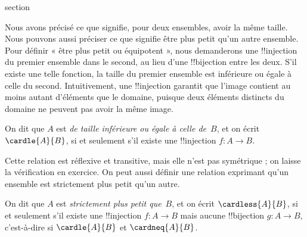 \documentclass[11pt,a4paper,openany]{memoir}
\begin{document}
\endgroup



\begingroup
\expandafter\def\csname ol@sectioncs\endcsname{section}
\def\olfilename{comparing-size}




\begin{explain}
Nous avons précisé ce que signifie, pour deux ensembles, avoir la
même taille. Nous pouvons aussi préciser ce que signifie être plus
petit qu'un autre ensemble. Pour définir « être plus petit ou
équipotent », nous demanderons une !!{injection} du premier ensemble
dans le second, au lieu d'une !!{bijection} entre les deux. S'il existe
une telle fonction, la taille du premier ensemble est inférieure ou
égale à celle du second. Intuitivement, une !!{injection} garantit
que l'image contient au moins autant d'éléments que le domaine,
puisque deux éléments distincts du domaine ne peuvent pas avoir
la même image.
\end{explain}

\begin{defn}
On dit que $A$ est \emph{de taille inférieure ou égale à celle
de}~$B$, et on écrit $\cardle{A}{B}$, si et seulement s'il existe
une !!{injection} $f \colon A \to B$.
\end{defn}

Cette relation est réflexive et transitive, mais elle n'est pas
symétrique ; on laisse la vérification en exercice. On peut aussi
définir une relation exprimant qu'un ensemble est strictement plus
petit qu'un autre.

\begin{defn}
On dit que $A$ est \emph{strictement plus petit que}~$B$, et on écrit
$\cardless{A}{B}$, si et seulement s'il existe une !!{injection}
$f\colon A \to B$ mais aucune !!{bijection} $g\colon A \to B$,
c'est-à-dire si $\cardle{A}{B}$ et $\cardneq{A}{B}$.
\end{defn}
\end{document}
